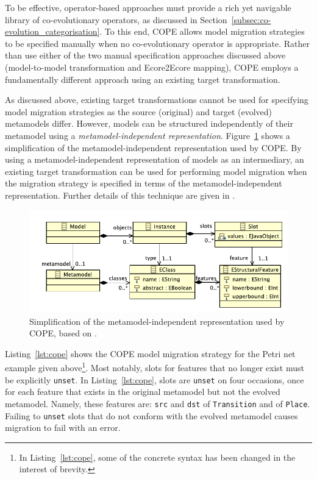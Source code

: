 To be effective, operator-based approaches must provide a rich yet navigable library of co-evolutionary operators, as discussed in Section~\ref{subsec:co-evolution_categorisation}. To this end, COPE allows model migration strategies to be specified manually when no co-evolutionary operator is appropriate. Rather than use either of the two manual specification approaches discussed above (model-to-model transformation and Ecore2Ecore mapping), COPE employs a fundamentally different approach using an existing target transformation.

As discussed above, existing target transformations cannot be used for specifying model migration strategies as the source (original) and target (evolved) metamodels differ. However, models can be structured independently of their metamodel using a \emph{metamodel-independent representation}. Figure~\ref{fig:cope_mmi} shows a simplification of the metamodel-independent representation used by COPE. By using a metamodel-independent representation of models as an intermediary, an existing target transformation can be used for performing model migration when the migration strategy is specified in terms of the metamodel-independent representation. Further details of this technique are given in \cite{herrmannsdoerfer09cope}.

\begin{figure}[tbp]
  \centering
  \includegraphics[scale=0.75]{5.Implementation/cope_mm.pdf}
  \caption{Simplification of the metamodel-independent representation used by COPE, based on \cite{herrmannsdoerfer09cope}.}
  \label{fig:cope_mmi}
\end{figure}

Listing~\ref{lst:cope} shows the COPE model migration strategy for the Petri net example given above\footnote{In Listing~\ref{lst:cope}, some of the concrete syntax has been changed in the interest of brevity.}. Most notably, slots for features that no longer exist must be explicitly \texttt{unset}. In Listing~\ref{lst:cope}, slots are \texttt{unset} on four occasions, once for each feature that exists in the original metamodel but not the evolved metamodel. Namely, these features are: \texttt{src} and \texttt{dst} of \texttt{Transition} and of \texttt{Place}. Failing to \texttt{unset} slots that do not conform with the evolved metamodel causes migration to fail with an error.

